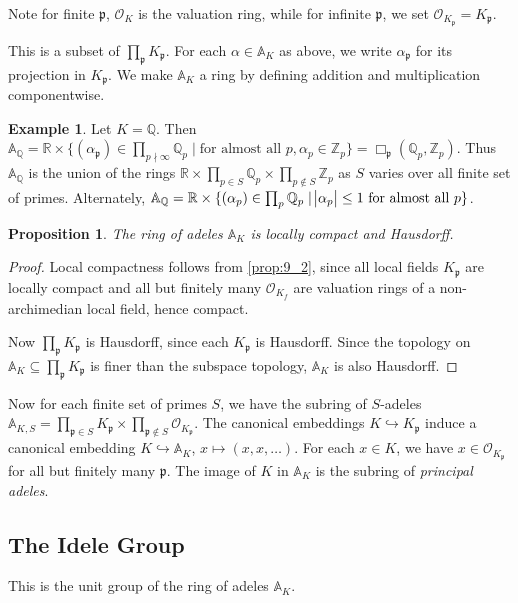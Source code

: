 \documentclass[11pt]{article}
\theoremstyle{definition}
\newtheorem{example}[definition]{Example}
\theoremstyle{plain}
\newtheorem{proposition}[definition]{Proposition}
\theoremstyle{remark}
\newcommand{\bA}{\mathbb{A}}
\newcommand{\ZZ}{\mathbb{Z}}
\newcommand{\QQ}{\mathbb{Q}}
\newcommand{\RR}{\mathbb{R}}
\newcommand{\cO}{\mathcal{O}}
\newcommand{\fp}{\mathfrak{p}}
\newcommand{\rprod}{\Box} %
\begin{document}
Note for finite $\fp$, $\cO_K$ is the valuation ring, while for infinite $\fp$, we set $\cO_{K_\fp} = K_\fp$.

This is a subset of $\prod_{\fp} K_\fp$. For each $\alpha \in \bA_K$ as above, we write $\alpha_\fp$ for its projection in $K_\fp$. We make $\bA_K$ a ring by defining addition and multiplication componentwise.

\begin{example}\label{eg:9_4}
    Let $K = \QQ$. Then $\bA_\QQ = \RR \times \{(\alpha_\fp) \in \prod_{p \nmid \infty} \QQ_p \mid \text{for almost all } p, \alpha_p \in \ZZ_p\} = \rprod_{\fp} (\QQ_p, \ZZ_p)$. Thus $\bA_\QQ$ is the union of the rings $\RR \times \prod_{p \in S} \QQ_p \times \prod_{p \notin S} \ZZ_p$ as $S$ varies over all finite set of primes. Alternately, $\bA_\QQ = \RR \times \{(\alpha_p) \in \prod_p \QQ_p \mid \abs{\alpha_p} \le 1 \text{ for almost all } p\}$.
\end{example}

\begin{proposition}\label{prop:9_5}
    The ring of adeles $\bA_K$ is locally compact and Hausdorff.
\end{proposition}
\begin{proof}
    Local compactness follows from \autoref{prop:9_2}, since all local fields $K_\fp$ are locally compact and all but finitely many $\cO_{K_f}$ are valuation rings of a non-archimedian local field, hence compact.

    Now $\prod_{\fp} K_\fp$ is Hausdorff, since each $K_\fp$ is Hausdorff. Since the topology on $\bA_K \subseteq \prod_{\fp} K_\fp$ is finer than the subspace topology, $\bA_K$ is also Hausdorff.
\end{proof}

Now for each finite set of primes $S$, we have the subring of $S$-adeles $\bA_{K,S} = \prod_{\fp \in S} K_\fp \times \prod_{\fp \notin S} \cO_{K_\fp}$. The canonical embeddings $K \hookrightarrow K_\fp$ induce a canonical embedding $K \hookrightarrow \bA_K$, $x \mapsto (x, x, \ldots)$. For each $x \in K$, we have $x \in \cO_{K_\fp}$ for all but finitely many $\fp$. The image of $K$ in $\bA_K$ is the subring of \emph{principal adeles}.

\subsection{The Idele Group}

This is the unit group of the ring of adeles $\bA_K$.
\end{document}
